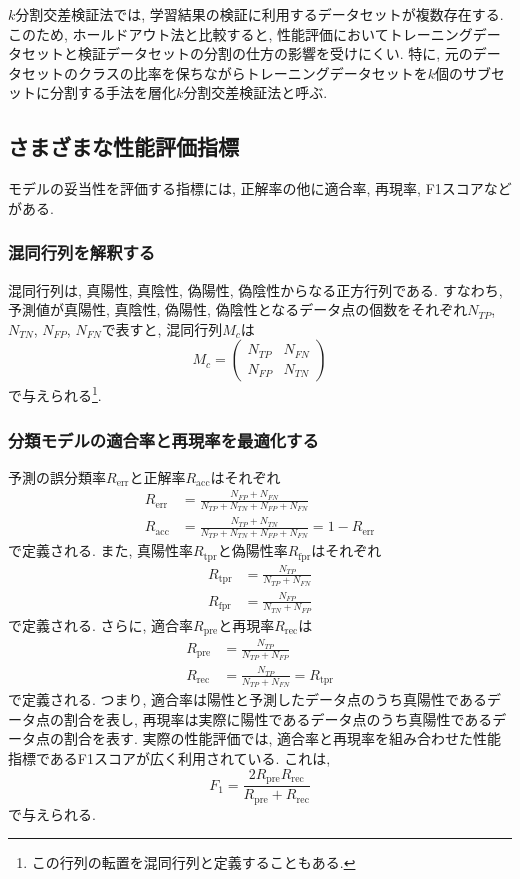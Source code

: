\documentclass[uplatex]{jsarticle}
\theoremstyle{definition}
\numberwithin{equation}{section}
\begin{document}
$k$分割交差検証法では, 学習結果の検証に利用するデータセットが複数存在する.
このため, ホールドアウト法と比較すると, 性能評価においてトレーニングデータセットと検証データセットの分割の仕方の影響を受けにくい.
特に, 元のデータセットのクラスの比率を保ちながらトレーニングデータセットを$k$個のサブセットに分割する手法を層化$k$分割交差検証法と呼ぶ.

\subsection{さまざまな性能評価指標}
モデルの妥当性を評価する指標には, 正解率の他に適合率, 再現率, F1スコアなどがある.

\subsubsection{混同行列を解釈する}
混同行列は, 真陽性, 真陰性, 偽陽性, 偽陰性からなる正方行列である.
すなわち, 予測値が真陽性, 真陰性, 偽陽性, 偽陰性となるデータ点の個数をそれぞれ$N_{TP}$, $N_{TN}$, $N_{FP}$, $N_{FN}$で表すと, 混同行列$M_{c}$は
\begin{equation}
    M_{c} = \begin{pmatrix}
        N_{TP} & N_{FN} \\
        N_{FP} & N_{TN}
    \end{pmatrix}
\end{equation}
で与えられる\footnote{この行列の転置を混同行列と定義することもある.}.

\subsubsection{分類モデルの適合率と再現率を最適化する}
予測の誤分類率$R_{\mathrm{err}}$と正解率$R_{\mathrm{acc}}$はそれぞれ
\begin{align}
    R_{\mathrm{err}} &= \frac{N_{FP} + N_{FN}}{N_{TP} + N_{TN} + N_{FP} + N_{FN}} \\
    R_{\mathrm{acc}} &= \frac{N_{TP} + N_{TN}}{N_{TP} + N_{TN} + N_{FP} + N_{FN}} = 1 - R_{\mathrm{err}}
\end{align}
で定義される.
また, 真陽性率$R_{\mathrm{tpr}}$と偽陽性率$R_{\mathrm{fpr}}$はそれぞれ
\begin{align}
    R_{\mathrm{tpr}} &= \frac{N_{TP}}{N_{TP} + N_{FN}} \\
    R_{\mathrm{fpr}} &= \frac{N_{FP}}{N_{TN} + N_{FP}}
\end{align}
で定義される.
さらに, 適合率$R_{\mathrm{pre}}$と再現率$R_{\mathrm{rec}}$は
\begin{align}
    R_{\mathrm{pre}} &= \frac{N_{TP}}{N_{TP} + N_{FP}} \\
    R_{\mathrm{rec}} &= \frac{N_{TP}}{N_{TP} + N_{FN}} = R_{\mathrm{tpr}}
\end{align}
で定義される.
つまり, 適合率は陽性と予測したデータ点のうち真陽性であるデータ点の割合を表し, 再現率は実際に陽性であるデータ点のうち真陽性であるデータ点の割合を表す.
実際の性能評価では, 適合率と再現率を組み合わせた性能指標であるF1スコアが広く利用されている.
これは, 
\begin{equation}
    F_{1} = \frac{2R_{\mathrm{pre}}R_{\mathrm{rec}}}{R_{\mathrm{pre}} + R_{\mathrm{rec}}}
\end{equation}
で与えられる.
\end{document}
